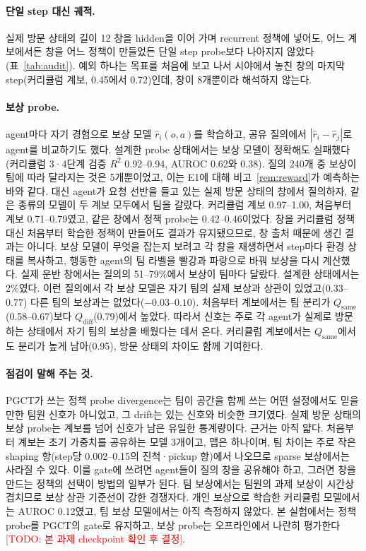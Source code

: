 \documentclass[twocolumn,10pt]{article}
\theoremstyle{remark}
\newcommand{\todo}[1]{\textcolor{red}{[TODO: #1]}}
\newcommand{\ours}{PGCT}
\begin{document}
\paragraph{단일 step 대신 궤적.} 실제 방문 상태의 길이 12 창을 hidden을 이어 가며 recurrent 정책에 넣어도, 어느 계보에서든 창을
어느 정책이 만들었든 단일 step probe보다 나아지지 않았다(표~\ref{tab:audit}). 예외 하나는 목표를 처음에 보고 나서 시야에서 놓친
창의 마지막 step(커리큘럼 계보, 0.45에서 0.72)인데, 창이 8개뿐이라 해석하지 않는다.

\paragraph{보상 probe.} agent마다 자기 경험으로 보상 모델 $\hat r_i(o,a)$를 학습하고, 공유 질의에서 $|\hat r_i-\hat r_j|$로
agent를 비교하기도 했다. 설계한 probe 상태에서는 보상 모델이 정확해도 실패했다(커리큘럼 3·4단계 검증 $R^2$ 0.92--0.94, AUROC
0.62와 0.38). 질의 240개 중 보상이 팀에 따라 달라지는 것은 5개뿐이었고, 이는 E1에 대해 비고~\ref{rem:reward}가 예측하는 바와
같다. 대신 agent가 요청 선반을 들고 있는 실제 방문 상태의 창에서 질의하자, 같은 종류의 모델이 두 계보 모두에서 팀을 갈랐다.
커리큘럼 계보 0.97--1.00, 처음부터 계보 0.71--0.79였고, 같은 창에서 정책 probe는 0.42--0.46이었다. 창을 커리큘럼 정책 대신
처음부터 학습한 정책이 만들어도 결과가 유지됐으므로, 창 출처 때문에 생긴 결과는 아니다. 보상 모델이 무엇을 잡는지 보려고 각
창을 재생하면서 step마다 환경 상태를 복사하고, 행동한 agent의 팀 라벨을 빨강과 파랑으로 바꿔 보상을 다시 계산했다. 실제 운반
창에서는 질의의 51--79\%에서 보상이 팀마다 달랐다. 설계한 상태에서는 2\%였다. 이런 질의에서 각 보상 모델은 자기 팀의 실제
보상과 상관이 있었고(0.33--0.77) 다른 팀의 보상과는 없었다($-0.03$--$0.10$). 처음부터 계보에서는 팀 분리가 $Q_{\mathrm{same}}$
(0.58--0.67)보다 $Q_{\mathrm{diff}}$(0.79)에서 높았다. 따라서 신호는 주로 각 agent가 실제로 방문하는 상태에서 자기 팀의 보상을
배웠다는 데서 온다. 커리큘럼 계보에서는 $Q_{\mathrm{same}}$에서도 분리가 높게 남아(0.95), 방문 상태의 차이도 함께 기여한다.

\paragraph{점검이 말해 주는 것.} \ours{}가 쓰는 정책 probe divergence는 팀이 공간을 함께 쓰는 어떤 설정에서도 믿을 만한 팀원
신호가 아니었고, 그 drift는 있는 신호와 비슷한 크기였다. 실제 방문 상태의 보상 probe는 계보를 넘어 신호가 남은 유일한 통계량이다.
근거는 아직 얇다. 처음부터 계보는 초기 가중치를 공유하는 모델 3개이고, 맵은 하나이며, 팀 차이는 주로 작은 shaping 항(step당
0.002--0.15의 진척·pickup 항)에서 나오므로 sparse 보상에서는 사라질 수 있다. 이를 gate에 쓰려면 agent들이 질의 창을 공유해야 하고,
그러면 창을 만드는 정책의 선택이 방법의 일부가 된다. 팀 보상에서는 팀원의 과제 보상이 시간상 겹치므로 보상 상관 기준선이 강한
경쟁자다. 개인 보상으로 학습한 커리큘럼 모델에서는 AUROC 0.12였고, 팀 보상 모델에서는 아직 측정하지 않았다. 본 실험에서는 정책
probe를 \ours{}의 gate로 유지하고, 보상 probe는 오프라인에서 나란히 평가한다 \todo{본 과제 checkpoint 확인 후 결정}.
\end{document}
